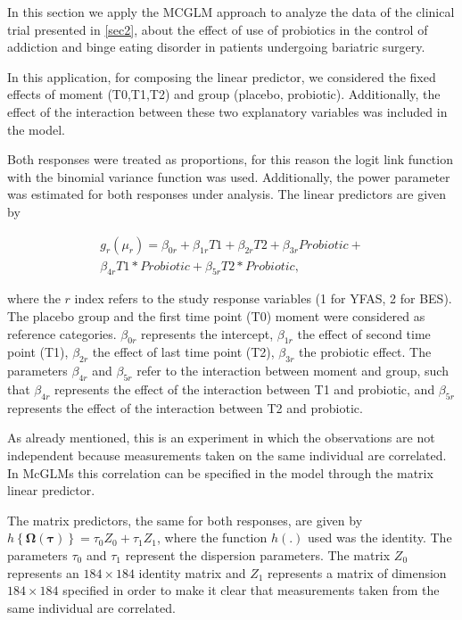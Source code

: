 \documentclass[USenglish]{article}
\theoremstyle{dgthm}
\theoremstyle{dgdef}
\begin{document}

In this section we apply the MCGLM approach to analyze the data of the clinical trial presented in \autoref{sec2}, about the effect of use of probiotics in the control of addiction and binge eating disorder in patients undergoing bariatric surgery.

In this application, for composing the linear predictor, we considered the fixed effects of moment (T0,T1,T2) and group (placebo, probiotic). Additionally, the effect of the interaction between these two explanatory variables was included in the model. 

Both responses were treated as proportions, for this reason the logit link function with the binomial variance function was used. Additionally, the power parameter was estimated for both responses under analysis. The linear predictors are given by

\begin{equation*}
  \begin{array}{r}
    g_{r}(\mu_{r}) = \beta_{0r} + \beta_{1r} T1 + \beta_{2r} T2 + \beta_{3r} Probiotic + \\ \beta_{4r} T1*Probiotic + \beta_{5r} T2*Probiotic,
  \end{array}
\end{equation*}

\noindent where the $r$ index refers to the study response variables (1 for YFAS, 2 for BES). The placebo group and the first time point (T0) moment were considered as reference categories. $\beta_{0r}$ represents the intercept, $\beta_{1r}$ the effect of second time point (T1), $\beta_{2r}$ the effect of last time point (T2), $\beta_{3r}$ the probiotic effect. The parameters $\beta_{4r}$ and $\beta_{5r}$ refer to the interaction between moment and group, such that $\beta_{4r}$ represents the effect of the interaction between T1 and probiotic, and $ \beta_{5r}$ represents the effect of the interaction between T2 and probiotic.

As already mentioned, this is an experiment in which the observations are not independent because measurements taken on the same individual are correlated. In McGLMs this correlation can be specified in the model through the matrix linear predictor.

The matrix predictors, the same for both responses, are given by $h\left \{ \boldsymbol{\Omega}(\boldsymbol{\tau}) \right \} = \tau_0Z_0 + \tau_1Z_1$, where the function $h(.)$ used was the identity. The parameters $\tau_0$ and $\tau_1$ represent the dispersion parameters. The matrix $Z_0$ represents an $184 \times 184$ identity matrix and $Z_1$ represents a matrix of dimension $184 \times 184$ specified in order to make it clear that measurements taken from the same individual are correlated. 
\end{document}
